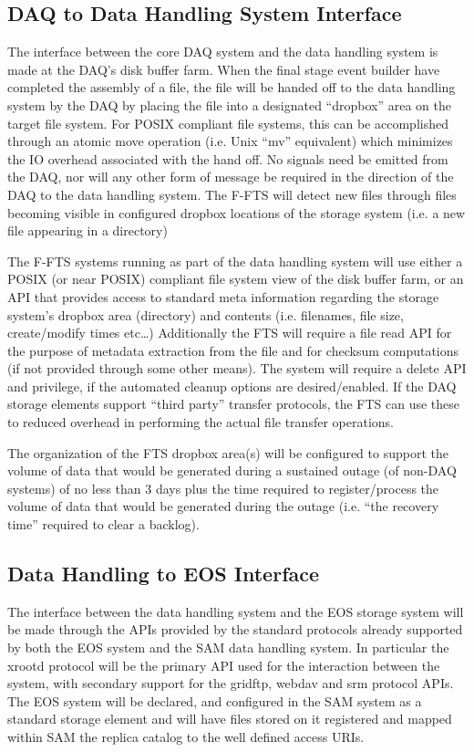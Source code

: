 \documentclass[pdftex,12pt,letter]{article}
\begin{document}
\subsection{DAQ to Data Handling System Interface}
The interface between the core DAQ system and the data handling system is made at the DAQ’s disk buffer farm.  When the final stage event builder have completed the assembly of a file, the file will be handed off to the data handling system by the DAQ by placing the file into a designated “dropbox” area on the target file system.  For POSIX compliant file systems, this can be accomplished through an atomic move operation (i.e. Unix “mv” equivalent) which minimizes the IO overhead associated with the hand off.  No signals need be emitted from the DAQ, nor will any other form of message be required in the direction of the DAQ to the data handling system.  The F-FTS will detect new files through files becoming visible in configured dropbox locations of the storage system (i.e. a new file appearing in a directory) 

    The F-FTS systems running as part of the data handling system will use either a POSIX (or near POSIX) compliant file system view of the disk buffer farm, or an API that provides access to standard meta information regarding the storage system’s dropbox area (directory) and contents (i.e. filenames, file size, create/modify times etc…)  Additionally the FTS will require a file read API for the purpose of metadata extraction from the file and for checksum computations (if not provided through some other means).  The system will require a delete API and privilege, if the automated cleanup options are desired/enabled.  If the DAQ storage elements support “third party” transfer protocols, the FTS can use these to reduced overhead in performing the actual file transfer operations.

The organization of the FTS dropbox area(s) will be configured to support the volume of data that would be generated during a sustained outage (of non-DAQ systems) of no less than 3 days plus the time required to register/process the volume of data that would be generated during the outage (i.e. “the recovery time” required to clear a backlog).

\subsection{Data Handling to EOS Interface}
The interface between the data handling system and the EOS storage system will be made through the APIs provided by the standard protocols already supported by both the EOS system and the SAM data handling system.  In particular the xrootd protocol will be the primary API used for the interaction between the system, with secondary support for the gridftp, webdav and srm protocol APIs.  The EOS system will be declared, and configured in the SAM system as a standard storage element and will have files stored on it registered and mapped within SAM the replica catalog to the well defined access URIs. 
\end{document}
